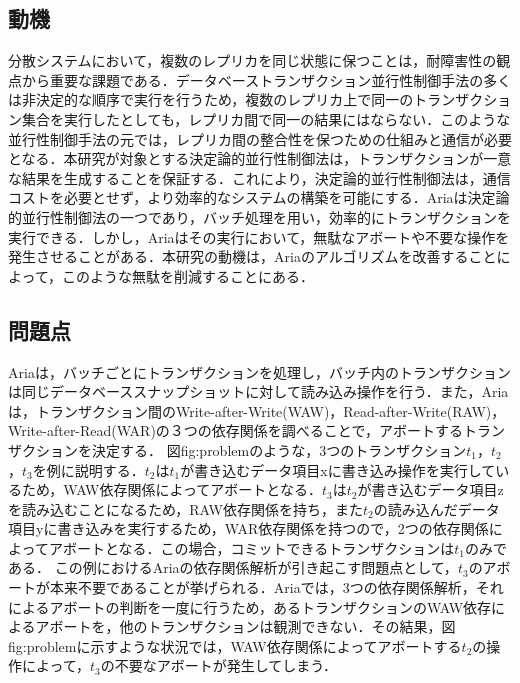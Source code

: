 \documentclass[submit]{ipsj}
\begin{document}
\subsection{動機}
分散システムにおいて，複数のレプリカを同じ状態に保つことは，耐障害性の観点から重要な課題である．データベーストランザクション並行性制御手法の多くは非決定的な順序で実行を行うため，複数のレプリカ上で同一のトランザクション集合を実行したとしても，レプリカ間で同一の結果にはならない．このような並行性制御手法の元では，レプリカ間の整合性を保つための仕組みと通信が必要となる．本研究が対象とする決定論的並行性制御法は，トランザクションが一意な結果を生成することを保証する．これにより，決定論的並行性制御法は，通信コストを必要とせず，より効率的なシステムの構築を可能にする．Ariaは決定論的並行性制御法の一つであり，バッチ処理を用い，効率的にトランザクションを実行できる．しかし，Ariaはその実行において，無駄なアボートや不要な操作を発生させることがある．本研究の動機は，Ariaのアルゴリズムを改善することによって，このような無駄を削減することにある．

\subsection{問題点}
Ariaは，バッチごとにトランザクションを処理し，バッチ内のトランザクションは同じデータベーススナップショットに対して読み込み操作を行う．また，Ariaは，トランザクション間のWrite-after-Write(WAW)，Read-after-Write(RAW)，Write-after-Read(WAR)の３つの依存関係を調べることで，アボートするトランザクションを決定する．
図{fig:problem}のような，3つのトランザクション$t_1$，$t_2$，$t_3$を例に説明する．$t_2$は$t_1$が書き込むデータ項目xに書き込み操作を実行しているため，WAW依存関係によってアボートとなる．$t_3$は$t_2$が書き込むデータ項目zを読み込むことになるため，RAW依存関係を持ち，また$t_2$の読み込んだデータ項目yに書き込みを実行するため，WAR依存関係を持つので，2つの依存関係によってアボートとなる．この場合，コミットできるトランザクションは$t_1$のみである．
この例におけるAriaの依存関係解析が引き起こす問題点として，$t_3$のアボートが本来不要であることが挙げられる．Ariaでは，3つの依存関係解析，それによるアボートの判断を一度に行うため，あるトランザクションのWAW依存によるアボートを，他のトランザクションは観測できない．その結果，図{fig:problem}に示すような状況では，WAW依存関係によってアボートする$t_2$の操作によって，$t_3$の不要なアボートが発生してしまう．
\end{document}
